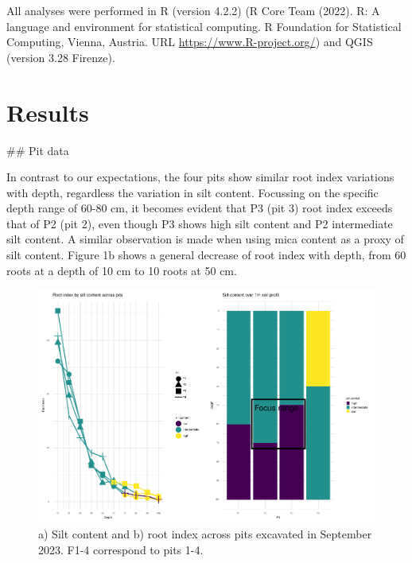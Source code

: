 \documentclass[fleqn,12pt]{latex/stylish_article} %
\begin{document}
All analyses were performed in R (version 4.2.2) (R Core Team (2022). R: A language and environment for statistical computing. R Foundation for Statistical Computing, Vienna, Austria. URL \url{https://www.R-project.org/}) and QGIS (version 3.28 Firenze).

\hypertarget{results}{%
\section{Results}\label{results}}

\scriptsize

\normalsize
\#\# Pit data

In contrast to our expectations, the four pits show similar root index variations with depth, regardless the variation in silt content. Focussing on the specific depth range of 60-80 cm, it becomes evident that P3 (pit 3) root index exceeds that of P2 (pit 2), even though P3 shows high silt content and P2 intermediate silt content. A similar observation is made when using mica content as a proxy of silt content. Figure 1b shows a general decrease of root index with depth, from 60 roots at a depth of 10 cm to 10 roots at 50 cm.



\scriptsize

\begin{figure}

{\centering \includegraphics[width=0.8\linewidth,]{pedoP16-report_files/figure-latex/pit-1} 

}

\caption{a) Silt content and b) root index across pits excavated in September 2023. F1-4 correspond to pits 1-4.}\label{fig:pit}
\end{figure}

\normalsize
\end{document}
